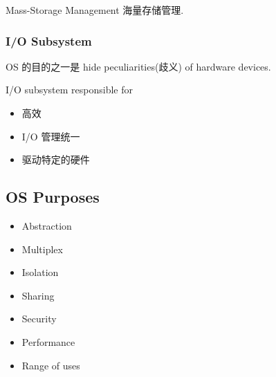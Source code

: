 Mass-Storage Management 海量存储管理. 

\subsubsection{I/O Subsystem}
OS 的目的之一是  hide peculiarities(歧义) of hardware devices. 

I/O subsystem responsible for
\begin{itemize}\small
    \item 高效
    \item I/O 管理统一
    \item 驱动特定的硬件
\end{itemize}


\subsection{OS Purposes}
\begin{itemize}
    \item Abstraction
    \item Multiplex
    \item Isolation
    \item Sharing
    \item Security
    \item Performance
    \item Range of uses
\end{itemize}
